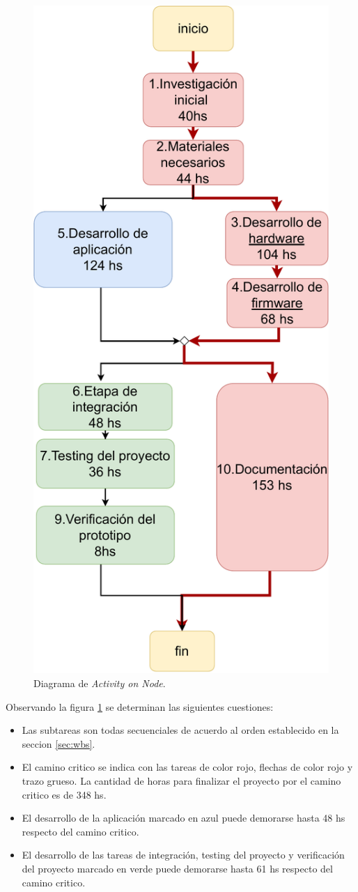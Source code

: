 \documentclass[
11pt, %
]{charter}
\begin{document}
\begin{figure}[htpb]
\centering 
\includegraphics[width=0.5 \textwidth, height=1.1 \textwidth]{./Figuras/AON.pdf}
\caption{Diagrama de \textit{Activity on Node}.}
\label{fig:AoN}
\end{figure}


Observando  la figura  \ref{fig:AoN} se determinan las siguientes cuestiones:

\begin{itemize}
	\item Las subtareas son todas secuenciales  de acuerdo al orden establecido en la seccion \ref{sec:wbs}.
	\item El camino critico se indica con las tareas de color rojo,  flechas de color rojo y trazo grueso. La cantidad de horas para finalizar el proyecto por el camino critico es de 348 hs.
	\item El desarrollo de la aplicación marcado en azul puede demorarse hasta 48 hs respecto del camino critico.
	\item El desarrollo de las tareas de integración, testing del proyecto y verificación del proyecto marcado en verde puede demorarse hasta 61 hs respecto del camino critico.
	

\end{itemize}
	
\end{document}
